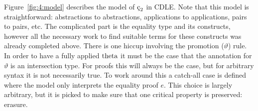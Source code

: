 Figure~\ref{fig:4:model} describes the model of $\ced$ in CDLE.
Note that this model is straightforward: abstractions to abstractions, applications to applications, pairs to pairs, etc.
The complicated part is the equality type and its constructs, however all the necessary work to find suitable terms for these constructs was already completed above.
There is one hiccup involving the promotion ($\vartheta$) rule.
In order to have a fully applied $\textnormal{theta}$ it must be the case that the annotation for $\vartheta$ is an intersection type.
For proofs this will always be the case, but for arbitrary syntax it is not necessarily true.
To work around this a catch-all case is defined where the model only interprets the equality proof $e$.
This choice is largely arbitrary, but it is picked to make sure that one critical property is preserved: erasure.



